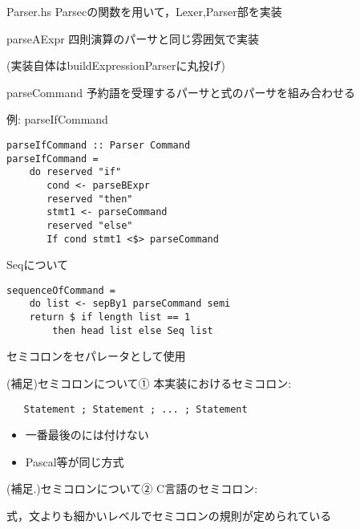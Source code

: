 \documentclass[uplatex,dvipdfmx,ja=standard]{beamer}
\begin{document}
\begin{frame}[fragile]{Parser.hs}
    Parsecの関数を用いて，Lexer,Parser部を実装

\end{frame}

\begin{frame}[fragile]{parseAExpr}
    四則演算のパーサと同じ雰囲気で実装

    (実装自体はbuildExpressionParserに丸投げ)
\end{frame}

\begin{frame}[fragile]{parseCommand}
    予約語を受理するパーサと式のパーサを組み合わせる

    例: parseIfCommand
    \begin{verbatim}
parseIfCommand :: Parser Command
parseIfCommand =
    do reserved "if"
       cond <- parseBExpr 
       reserved "then"
       stmt1 <- parseCommand
       reserved "else"
       If cond stmt1 <$> parseCommand
   \end{verbatim}
\end{frame}

\begin{frame}[fragile]{Seqについて}
    \begin{verbatim}
sequenceOfCommand =
    do list <- sepBy1 parseCommand semi
    return $ if length list == 1 
        then head list else Seq list
   \end{verbatim}

セミコロンをセパレータとして使用

\end{frame}

\begin{frame}[fragile]{(補足)セミコロンについて①}
    本実装におけるセミコロン:
   \begin{verbatim}
   Statement ; Statement ; ... ; Statement
   \end{verbatim}
   \begin{itemize}
       \item 一番最後のには付けない
       \item Pascal等が同じ方式
   \end{itemize}
\end{frame}


\begin{frame}[fragile]{(補足.)セミコロンについて②}
    C言語のセミコロン:

    式，文よりも細かいレベルでセミコロンの規則が定められている
\end{frame}
\end{document}
